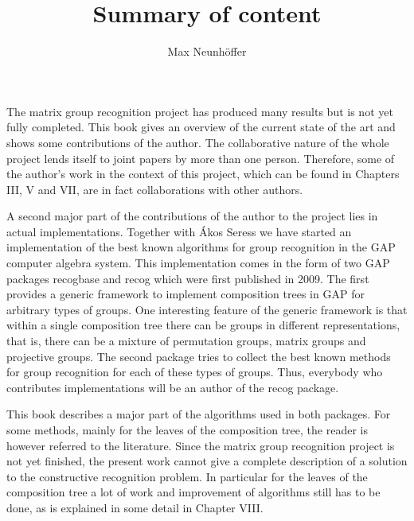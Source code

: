 \documentclass[11pt]{article}
\begin{document}
\title{Summary of content}
\author{Max Neunh\"offer}
\maketitle

The matrix group recognition project has produced many results but is
not yet fully completed. This book gives an overview of the current
state of the art and shows some contributions of the author. The
collaborative nature of the whole project lends itself to joint papers
by more than one person. Therefore, some of the author’s work in the
context of this project, which can be found in Chapters III, V and VII,
are in fact collaborations with other authors.

A second major part of the contributions of the author to the project
lies in actual implementations. Together with \'{A}kos Seress
we have started an implementation of the best known algorithms
for group recognition in the GAP computer algebra system. This
implementation comes in the form of two GAP packages \textsf{recogbase}
and \textsf{recog} which were first published in 2009. The first
provides a generic framework to implement composition trees in GAP
for arbitrary types of groups. One interesting feature of the generic
framework is that within a single composition tree there can be groups
in different representations, that is, there can be a mixture of
permutation groups, matrix groups and projective groups. The second
package tries to collect the best known methods for group recognition
for each of these types of groups. Thus, everybody who contributes
implementations will be an author of the recog package.

This book describes a major part of the algorithms used in both
packages. For some methods, mainly for the leaves of the composition
tree, the reader is however referred to the literature. Since the
matrix group recognition project is not yet finished, the present work
cannot give a complete description of a solution to the constructive
recognition problem. In particular for the leaves of the composition
tree a lot of work and improvement of algorithms still has to be done,
as is explained in some detail in Chapter VIII.
\end{document}
